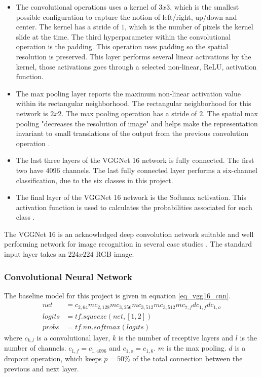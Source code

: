 \begin{itemize}
\item The convolutional operations uses a kernel of $3x3$, which is the smallest possible configuration to capture the notion of left/right, up/down and center. The kernel has a stride of $1$, which is the number of pixels the kernel slide at the time.
The third hyperparameter within the convolutional operation is the padding. This operation uses padding so the spatial resolution is preserved. This layer performs several linear activations by the kernel, those activations goes through a selected non-linear, ReLU, activation function.
\item The max pooling layer reports the maximum non-linear activation value within its rectangular neighborhood. The rectangular neighborhood for this network is $2x2$. The max pooling operation has a stride of $2$. The spatial max pooling "decreases the resolution of image" and helps make the representation invariant to small translations of the output from the previous convolution operation \cite[sec. 9]{dl_book}.
	\item The last three layers of the VGGNet 16 network is fully connected. The first two have 4096 channels. The last fully connected layer performs a six-channel classification, due to the six classes in this project.
	\item The final layer of the VGGNet 16 network is the Softmax activation. This activation function is used to calculates the probabilities associated for each class \cite[eq. 4.1]{dl_book}.  
\end{itemize}
The VGGNet 16 is an acknowledged deep convolution network suitable and well performing network for image recognition in several case studies \cite{VGGnet16, stand_cnn_notes}.  
The standard input layer takes an $224x224$ RGB image.


\subsubsection{Convolutional Neural Network}

The baseline model for this project is given in equation \ref{eq_vgg16_cnn}. 
\begin{equation}
\begin{aligned}
net &= c_{2,64}mc_{2,128}mc_{3,256}mc_{3,512}mc_{3,512}m c_{7,f} d c_{1, f} dc_{1,o}	\\
logits &= tf.squeeze(net, [1, 2])\\
probs &= tf.nn.softmax(logits)
\end{aligned}
\label{eq_vgg16_cnn}
\end{equation}
where $c_{k,l}$ is a convolutional layer, $k$ is the number of receptive layers and $l$ is the number of channels. $c_{1,f} = c_{1,4096}$ and $c_{1,o} = c_{1,6}$.
$m$ is the max pooling. $d$ is a dropout operation, which keeps  $p = 50\%$ of the total connection between the previous and next layer. 

